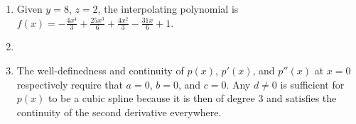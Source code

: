 \documentclass[a4paper,12pt]{article}
\begin{document}
\begin{enumerate}
    \item
        Given $y = 8$, $z = 2$, the interpolating polynomial is $f(x) = -\frac{4x^4}{3} + \frac{25x^3}{6} + \frac{4x^2}{3} - \frac{31x}{6} + 1$.
    \item
    \item
        The well-definedness and continuity of $p(x)$, $p'(x)$, and $p''(x)$ at $x = 0$ respectively require that $a = 0$, $b = 0$, and $c = 0$. Any $d \neq 0$ is sufficient for $p(x)$ to be a cubic spline because it is then of degree $3$ and satisfies the continuity of the second derivative everywhere.
\end{enumerate}
\end{document}

